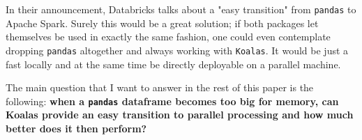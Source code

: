 In their announcement, Databricks talks about a "easy transition" from \texttt{pandas} to Apache Spark. Surely this would be a great solution; if both packages let themselves be used in exactly the same fashion, one could even contemplate dropping \texttt{pandas} altogether and always working with \texttt{Koalas}. It would be just a fast locally and at the same time be directly deployable on a parallel machine.

The main question that I want to answer in the rest of this paper is the following: \textbf{when a \texttt{pandas} dataframe becomes too big for memory, can Koalas provide an easy transition to parallel processing and how much better does it then perform?}

